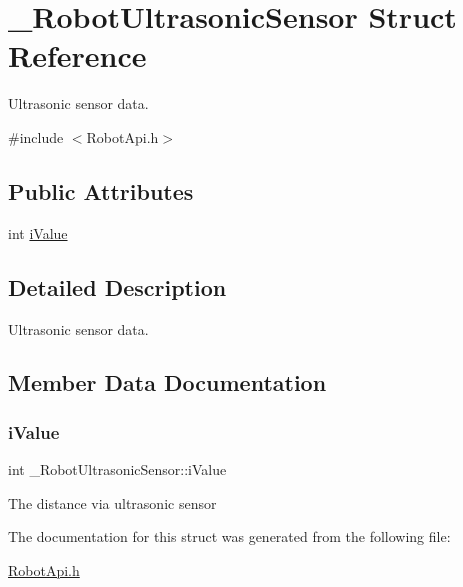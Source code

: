 \hypertarget{struct__RobotUltrasonicSensor}{}\section{\+\_\+\+Robot\+Ultrasonic\+Sensor Struct Reference}
\label{struct__RobotUltrasonicSensor}


Ultrasonic sensor data.  




{\ttfamily \#include $<$Robot\+Api.\+h$>$}

\subsection*{Public Attributes}
\begin{DoxyCompactItemize}
\item 
int \hyperlink{struct__RobotUltrasonicSensor_a5ca5e4487dcbe1a83820e06ddcd9c047}{i\+Value}
\end{DoxyCompactItemize}


\subsection{Detailed Description}
Ultrasonic sensor data. 

\subsection{Member Data Documentation}
\mbox{\label{struct__RobotUltrasonicSensor_a5ca5e4487dcbe1a83820e06ddcd9c047}} 
\subsubsection{\texorpdfstring{i\+Value}{iValue}}
{\footnotesize\ttfamily int \+\_\+\+Robot\+Ultrasonic\+Sensor\+::i\+Value}

The distance via ultrasonic sensor 

The documentation for this struct was generated from the following file\+:\begin{DoxyCompactItemize}
\item 
\hyperlink{RobotApi_8h}{Robot\+Api.\+h}\end{DoxyCompactItemize}
